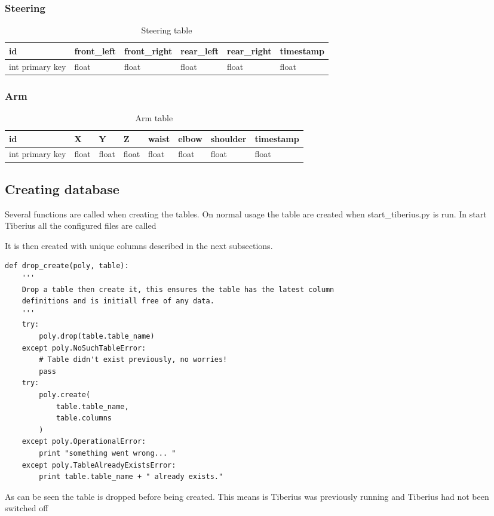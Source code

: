\subsubsection{Steering}
\begin{table}[!htb]
\centering
\caption{Steering table}
\label{my-label}
\begin{tabular}{@{}llllll@{}}
\toprule
id              & front\_left & front\_right & rear\_left & rear\_right & timestamp \\ \midrule
int primary key & float       & float        & float      & float       & float    
\end{tabular}
\end{table}

\subsubsection{Arm}
\begin{table}[!htb]
\centering
\caption{Arm table}
\label{my-label}
\begin{tabular}{@{}llllllll@{}}
\toprule
id              & X     & Y     & Z     & waist & elbow & shoulder & timestamp \\ \midrule
int primary key & float & float & float & float & float & float    & float    
\end{tabular}
\end{table}


\subsection{Creating database}
Several functions are called when creating the tables. On normal usage the table are created when start\_tiberius.py is run. In start Tiberius all the configured files are called




It is then created with unique columns described in the next subsections.

\begin{lstlisting}       
def drop_create(poly, table):
    '''
    Drop a table then create it, this ensures the table has the latest column
    definitions and is initiall free of any data.
    '''
    try:
        poly.drop(table.table_name)
    except poly.NoSuchTableError:
        # Table didn't exist previously, no worries!
        pass
    try:
        poly.create(
            table.table_name,
            table.columns
        )
    except poly.OperationalError:
        print "something went wrong... "
    except poly.TableAlreadyExistsError:
        print table.table_name + " already exists."
\end{lstlisting}  
As can be seen the table is dropped before being created. This means is Tiberius was previously running and Tiberius had not been switched off

